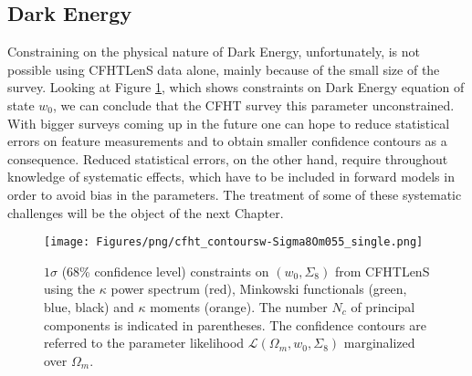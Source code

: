 \subsection{Dark Energy}
Constraining on the physical nature of Dark Energy, unfortunately, is not possible using CFHTLenS data alone, mainly because of the small size of the survey. Looking at Figure \ref{fig:6:cwSi855signle}, which shows constraints on Dark Energy equation of state $w_0$, we can conclude that the CFHT survey this parameter unconstrained. With bigger surveys coming up in the future one can hope to reduce statistical errors on feature measurements and to obtain smaller confidence contours as a consequence. Reduced statistical errors, on the other hand, require throughout knowledge of systematic effects, which have to be included in forward models in order to avoid bias in the parameters. The treatment of some of these systematic challenges will be the object of the next Chapter. 
%
\begin{figure}[h!]
\begin{center}
\texttt{[image: Figures/png/cfht\_contoursw-Sigma8Om055\_single.png]}
\end{center}
\caption{$1\sigma$ (68\% confidence level) constraints on $(w_0,\Sigma_8)$ from CFHTLenS using the $\kappa$ power spectrum (red), Minkowski functionals (green, blue, black) and $\kappa$ moments (orange). The number $N_c$ of principal components is indicated in parentheses. The confidence contours are referred to the parameter likelihood $\mathcal{L}(\Omega_m,w_0,\Sigma_8)$ marginalized over $\Omega_m$.}
\label{fig:6:cwSi855signle}
\end{figure}


%